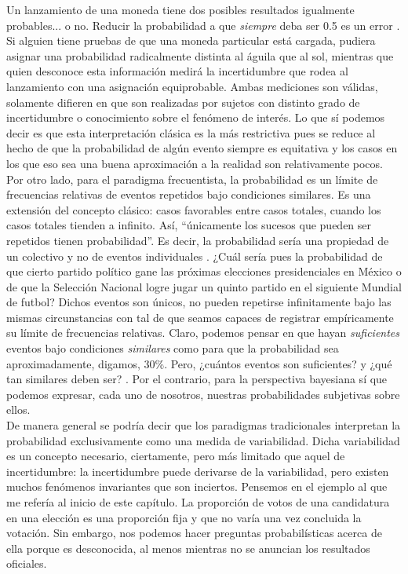 Un lanzamiento de una moneda tiene dos posibles resultados igualmente probables... o no. Reducir la probabilidad a que \textit{siempre} deba ser 0.5 es un error \parencite{Nozer17}. Si alguien tiene pruebas de que una moneda particular está cargada, pudiera asignar una probabilidad radicalmente distinta al águila que al sol, mientras que quien desconoce esta información medirá la incertidumbre que rodea al lanzamiento con una asignación equiprobable. Ambas mediciones son válidas, solamente difieren en que son realizadas por sujetos con distinto grado de incertidumbre o conocimiento sobre el fenómeno de interés. Lo que sí podemos decir es que esta interpretación clásica es la más restrictiva pues se reduce al hecho de que la probabilidad de algún evento siempre es equitativa y los casos en los que eso sea una buena aproximación a la realidad son relativamente pocos.\\	 
	 
Por otro lado, para el paradigma frecuentista, la probabilidad es un límite de frecuencias relativas de eventos repetidos bajo condiciones similares. Es una extensión del concepto clásico: casos favorables entre casos totales, cuando los casos totales tienden a infinito. Así, ``únicamente los sucesos que pueden ser repetidos tienen probabilidad''\parencite{Aquino10}. Es decir, la probabilidad sería una propiedad de un colectivo  y no de eventos individuales \parencite{Nozer17}. ¿Cuál sería pues la probabilidad de que cierto partido político gane las próximas elecciones presidenciales en México o de que la Selección Nacional logre jugar un quinto partido en el siguiente Mundial de futbol? Dichos eventos son únicos, no pueden repetirse infinitamente bajo las mismas circunstancias con tal de que seamos capaces de registrar empíricamente su límite de frecuencias relativas. Claro, podemos pensar en que hayan \textit{suficientes} eventos bajo condiciones \textit{similares} como para que la probabilidad sea aproximadamente, digamos, 30\%. Pero, ¿cuántos eventos son suficientes? y ¿qué tan similares deben ser? \parencite{Nozer17}. Por el contrario, para la perspectiva bayesiana sí que podemos expresar, cada uno de nosotros, nuestras probabilidades subjetivas sobre ellos.\\ 
	
	De manera general se podría decir que los paradigmas tradicionales interpretan la probabilidad exclusivamente como una medida de variabilidad. Dicha variabilidad es un concepto necesario, ciertamente, pero más limitado que aquel de incertidumbre: la incertidumbre puede derivarse de la variabilidad, pero existen muchos fenómenos invariantes que son inciertos. Pensemos en el ejemplo al que me refería al inicio de este capítulo. La proporción de votos de una candidatura en una elección es una proporción fija y que no varía una vez concluida la votación. Sin embargo, nos podemos hacer preguntas probabilísticas acerca de ella porque es desconocida, al menos mientras no se anuncian los resultados oficiales.\\ 
	
